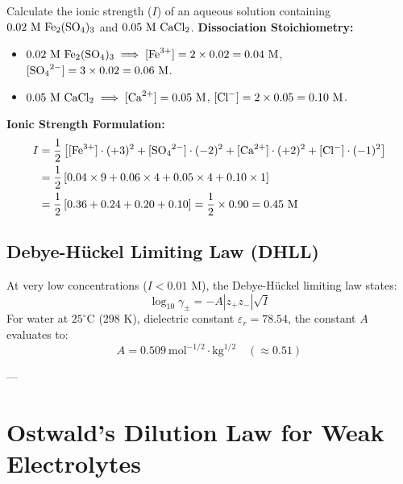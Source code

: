 \begin{examplebox}
Calculate the ionic strength ($I$) of an aqueous solution containing $0.02\text{ M } \ce{Fe2(SO4)3}$ and $0.05\text{ M } \ce{CaCl2}$.
\tcblower
\textbf{Dissociation Stoichiometry:}
\begin{itemize}
    \item $0.02\text{ M } \ce{Fe2(SO4)3} \implies [\ce{Fe^3+}] = 2 \times 0.02 = 0.04\text{ M}$, $[\ce{SO4^2-}] = 3 \times 0.02 = 0.06\text{ M}$.
    \item $0.05\text{ M } \ce{CaCl2} \implies [\ce{Ca^2+}] = 0.05\text{ M}$, $[\ce{Cl-}] = 2 \times 0.05 = 0.10\text{ M}$.
\end{itemize}
\textbf{Ionic Strength Formulation:}
\begin{align*}
    I &= \frac{1}{2} \left[ [\ce{Fe^3+}] \cdot (+3)^2 + [\ce{SO4^2-}] \cdot (-2)^2 + [\ce{Ca^2+}] \cdot (+2)^2 + [\ce{Cl-}] \cdot (-1)^2 \right] \\
    &= \frac{1}{2} \left[ 0.04 \times 9 + 0.06 \times 4 + 0.05 \times 4 + 0.10 \times 1 \right] \\
    &= \frac{1}{2} \left[ 0.36 + 0.24 + 0.20 + 0.10 \right] = \frac{1}{2} \times 0.90 = 0.45\text{ M}
\end{align*}
\end{examplebox}

\subsection{Debye-Hückel Limiting Law (DHLL)}
At very low concentrations ($I < 0.01\text{ M}$), the Debye-Hückel limiting law states:
\begin{equation}
    \boxed{\log_{10} \gamma_\pm = -A |z_+ z_-| \sqrt{I}}
\end{equation}
For water at $25^\circ\text{C}$ ($298\text{ K}$), dielectric constant $\varepsilon_r = 78.54$, the constant $A$ evaluates to:
\begin{equation}
    A = 0.509\ \text{mol}^{-1/2}\cdot\text{kg}^{1/2} \quad (\approx 0.51)
\end{equation}

---

\section{Ostwald's Dilution Law for Weak Electrolytes}

